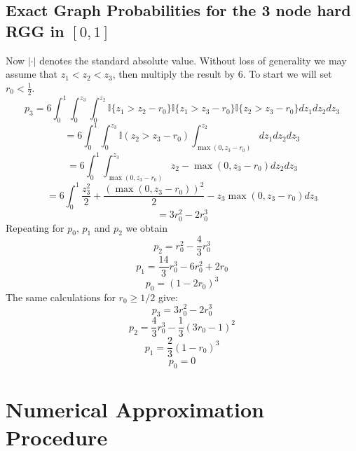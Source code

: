 \documentclass{article}
\begin{document}
\subsection{Exact Graph Probabilities for the 3 node hard RGG in $[0,1]$}
Now $|\cdot|$ denotes the standard absolute value. Without loss of generality we may assume that $z_1 < z_2 < z_3$, then multiply the result by 6. To start we will set $r_0 < \frac{1}{2}$. 
\begin{equation}
    p_3 = 6\int_0^1\int_0^{z_3}\int_0^{z_2} \mathbb{I}\{z_1>z_2-r_0\}\mathbb{I}\{z_1>z_3-r_0\}\mathbb{I}\{z_2>z_3-r_0\}dz_1dz_2dz_3
\end{equation}
\begin{equation}
    = 6 \int_0^1 \int_0^{z_3} \mathbb{I}(z_2 > z_3-r_0)\int_{\max(0, z_3-r_0)}^{z_2}dz_1dz_2dz_3
\end{equation}
\begin{equation}
    = 6 \int_0^1 \int_{\max(0, z_3-r_0)}^{z_3} z_2 - \max(0, z_3-r_0) dz_2dz_3
\end{equation}
\begin{equation}
    = 6 \int_0^1 \frac{z_3^2}{2}+\frac{(\max(0,z_3-r_0))^2}{2} - z_3\max(0, z_3-r_0) dz_3
\end{equation}
\begin{equation}
     = 3r_0^2-2r_0^3
\end{equation}
Repeating for $p_0$, $p_1$ and $p_2$ we obtain
\begin{equation}
    p_2 = r_0^2 - \frac{4}{3}r_0^3
\end{equation}
\begin{equation}
    p_1 = \frac{14}{3}r_0^3 - 6r_0^2 + 2r_0
\end{equation}
\begin{equation}
    p_0 = (1-2r_0)^{3}
\end{equation}
The same calculations for $r_0 \geq 1/2$ give:
\begin{equation}
    p_3 = 3r_0^2 - 2r_0^3
\end{equation}
\begin{equation}
    p_2 = \frac{4}{3}r_0^3-\frac{1}{3}({3}r_0-1)^2
\end{equation}
\begin{equation}
    p_1 = \frac{2}{3}(1-r_0)^{3}
\end{equation}
\begin{equation}
    p_0 = 0
\end{equation}



\section{Numerical Approximation Procedure}
\label{error}
\end{document}
